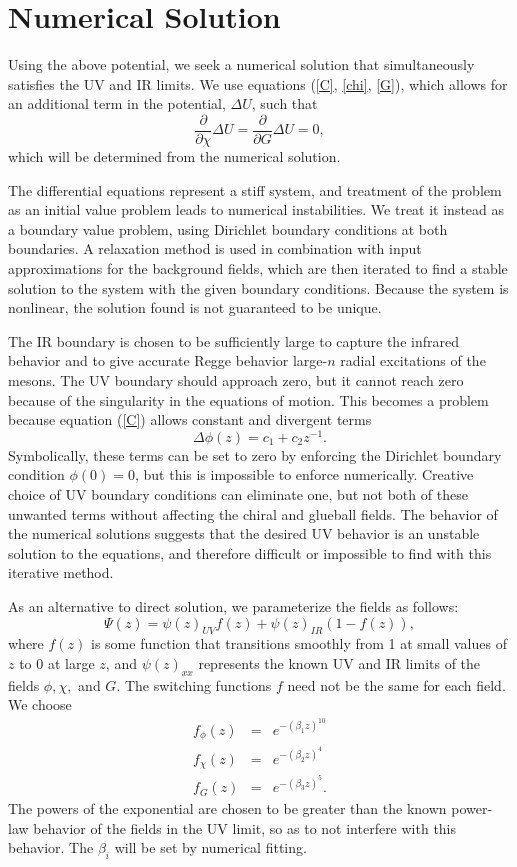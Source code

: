 \documentclass[aps,prd,12pt,nofootinbib]{revtex4}
\newcommand{\be}{\begin{equation}}
\newcommand{\ee}{\end{equation}}
\newcommand{\ba}{\begin{eqnarray}}
\newcommand{\ea}{\end{eqnarray}}
\begin{document}
\section{Numerical Solution}

Using the above potential, we seek a numerical solution that simultaneously satisfies the UV and IR limits. 
We use equations (\ref{C}, \ref{chi}, \ref{G}), which allows for an additional term in the potential, $\Delta U$, such that 
\be
\frac{\partial }{\partial \chi} \Delta U = \frac{\partial }{\partial G}\Delta U = 0,
\ee
which will be determined from the numerical solution.

The differential equations represent a stiff system, and treatment of the problem as an initial value problem leads to numerical instabilities. 
We treat it instead as a boundary value problem, using Dirichlet boundary conditions at both boundaries. 
A relaxation method is used in combination with input approximations for the background fields, which are then iterated to find a stable solution to the system with the given boundary conditions. 
Because the system is nonlinear, the solution found is not guaranteed to be unique.

The IR boundary is chosen to be sufficiently large to capture the infrared behavior and to give accurate Regge behavior large-$n$ radial excitations of the mesons. 
The UV boundary should approach zero, but it cannot reach zero because of the singularity in the equations of motion. 
This becomes a problem because equation (\ref{C}) allows constant and divergent terms 
\be
\Delta \phi(z) = c_1 + c_2 z^{-1}.
\ee
Symbolically, these terms can be set to zero by enforcing the Dirichlet boundary condition $\phi(0)=0$, but this is impossible to enforce numerically. 
Creative choice of UV boundary conditions can eliminate one, but not both of these unwanted terms without affecting the chiral and glueball fields. 
The behavior of the numerical solutions suggests that the desired UV behavior is an unstable solution to the equations, and therefore difficult or impossible to find with this iterative method.

As an alternative to direct solution, we parameterize the fields as follows:
\be
\Psi(z) = \psi(z)_{UV} f(z) + \psi(z)_{IR} \left(1-f(z)\right),
\ee
where $f(z)$ is some function that transitions smoothly from 1 at small values of $z$ to 0 at large $z$, and $\psi(z)_{xx}$ represents the known UV and IR limits of the fields $\phi, \chi,$ and $G$. 
The switching functions $f$ need not be the same for each field. We choose 
\ba
f_\phi(z)&=&e^{-(\beta_1z)^{10}}\\ \label{param1}
f_\chi(z)&=&e^{-(\beta_2z)^4}\\  \label{param2}
f_G(z)&=&e^{-(\beta_3z)^5}. \label{param3}
\ea
The powers of the exponential are chosen to be greater than the known power-law behavior of the fields in the UV limit, so as to not interfere with this behavior. 
The $\beta_i$ will be set by numerical fitting.
\end{document}
